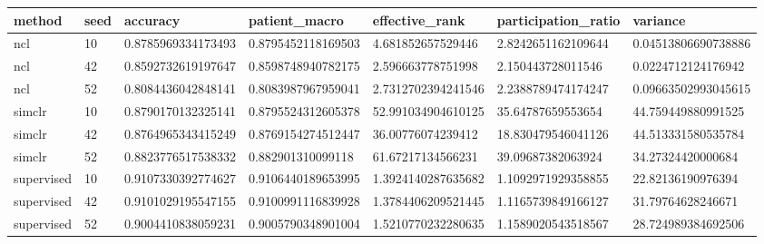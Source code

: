 \begin{tabular}{lllllll}
\toprule
method & seed & accuracy & patient\_macro & effective\_rank & participation\_ratio & variance \\
\midrule
ncl & 10 & 0.8785969334173493 & 0.8795452118169503 & 4.681852657529446 & 2.8242651162109644 & 0.04513806690738886 \\
ncl & 42 & 0.8592732619197647 & 0.8598748940782175 & 2.596663778751998 & 2.150443728011546 & 0.0224712124176942 \\
ncl & 52 & 0.8084436042848141 & 0.8083987967959041 & 2.7312702394241546 & 2.2388789474174247 & 0.09663502993045615 \\
simclr & 10 & 0.8790170132325141 & 0.8795524312605378 & 52.991034904610125 & 35.64787659553654 & 44.759449880991525 \\
simclr & 42 & 0.8764965343415249 & 0.8769154274512447 & 36.00776074239412 & 18.830479546041126 & 44.513331580535784 \\
simclr & 52 & 0.8823776517538332 & 0.882901310099118 & 61.67217134566231 & 39.09687382063924 & 34.27324420000684 \\
supervised & 10 & 0.9107330392774627 & 0.9106440189653995 & 1.3924140287635682 & 1.1092971929358855 & 22.82136190976394 \\
supervised & 42 & 0.9101029195547155 & 0.9100991116839928 & 1.3784406209521445 & 1.1165739849166127 & 31.79764628246671 \\
supervised & 52 & 0.9004410838059231 & 0.9005790348901004 & 1.5210770232280635 & 1.1589020543518567 & 28.724989384692506 \\
\bottomrule
\end{tabular}
